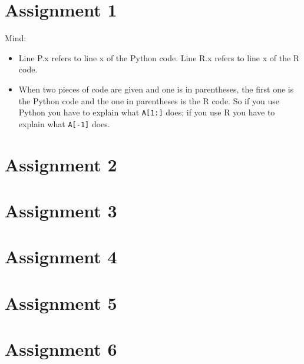 \documentclass[assignments]{subfiles}
\begin{document}
\maketitle
\tableofcontents




\section{Assignment 1}

Mind:
\begin{itemize}
\item Line P.x refers to line x of the Python code.   Line R.x refers to line x of the R code.
\item  When two pieces of code are given and one is in parentheses, the first one is the Python code and the one in parentheses is the R code. So if you use Python you have to explain what  \texttt{A[1:]} does; if you use R you have to explain what \texttt{A[-1]} does.
\end{itemize}


%


%


\section{Assignment 2}

%



\section{Assignment 3}
%
%

%



\section{Assignment 4}
%
%
%



\section{Assignment 5}







\section{Assignment 6}




\end{document}
